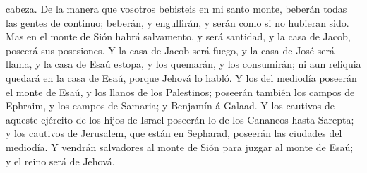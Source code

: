 cabeza.  De la manera que vosotros bebisteis en mi santo
monte, beberán todas las gentes de continuo; beberán, y engullirán, y
serán como si no hubieran sido.  Mas en el monte de Sión
habrá salvamento, y será santidad, y la casa de Jacob, poseerá sus
posesiones.  Y la casa de Jacob será fuego, y la casa de
José será llama, y la casa de Esaú estopa, y los quemarán, y los
consumirán; ni aun reliquia quedará en la casa de Esaú, porque Jehová lo
habló.  Y los del mediodía poseerán el monte de Esaú, y los
llanos de los Palestinos; poseerán también los campos de Ephraim, y los
campos de Samaria; y Benjamín á Galaad.  Y los cautivos de
aqueste ejército de los hijos de Israel poseerán lo de los Cananeos
hasta Sarepta; y los cautivos de Jerusalem, que están en Sepharad,
poseerán las ciudades del mediodía.  Y vendrán salvadores
al monte de Sión para juzgar al monte de Esaú; y el reino será de
Jehová.
